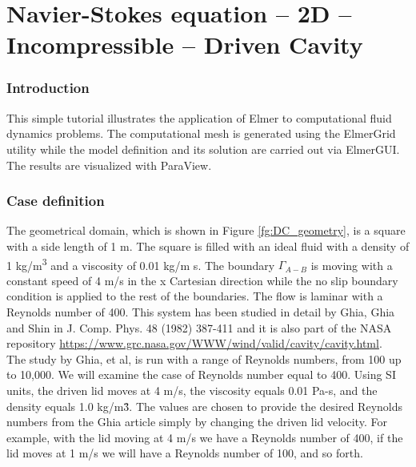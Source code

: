 \chapter{Navier-Stokes equation -- 2D -- Incompressible -- Driven Cavity}



\subsection*{Introduction}

This simple tutorial illustrates the application of Elmer to computational fluid dynamics problems.
The computational mesh is generated using the ElmerGrid utility while the model definition and its solution are carried out via ElmerGUI. The results are visualized with ParaView.

\subsection*{Case definition}

The geometrical domain, which is shown in Figure \ref{fg:DC_geometry}, is a square with a side length of 1 m. The square is filled with an ideal fluid with a density of 1 kg/m\textsuperscript{3} and a viscosity of 0.01 kg/m s. The boundary $\Gamma_{A-B}$ is moving with a constant speed of 4 m/s in the x Cartesian direction while the no slip boundary condition is applied to the rest of the boundaries. The flow is laminar with a Reynolds number of 400. This system has been studied in detail by Ghia, Ghia and Shin in J. Comp. Phys. 48 (1982) 387-411 and it is also part of the NASA repository \url{https://www.grc.nasa.gov/WWW/wind/valid/cavity/cavity.html}.\\

The study by Ghia, et al, is run with a range of Reynolds numbers, from 100 up to 10,000.  We will examine the case of Reynolds number equal to 400.  Using SI units, the driven lid moves at 4 m/s, the viscosity equals 0.01 Pa-s, and the density equals 1.0 kg/m\^3.  The values are chosen to provide the desired Reynolds numbers from the Ghia article simply by changing the driven lid velocity.  For example, with the lid moving at 4 m/s we have a Reynolds number of 400, if the lid moves at 1 m/s we will have a Reynolds number of 100, and so forth.\\

